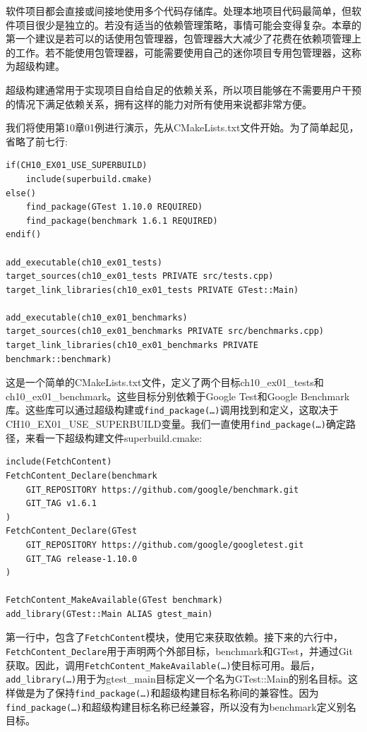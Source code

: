 
软件项目都会直接或间接地使用多个代码存储库。处理本地项目代码最简单，但软件项目很少是独立的。若没有适当的依赖管理策略，事情可能会变得复杂。本章的第一个建议是若可以的话使用包管理器，包管理器大大减少了花费在依赖项管理上的工作。若不能使用包管理器，可能需要使用自己的迷你项目专用包管理器，这称为超级构建。

超级构建通常用于实现项目自给自足的依赖关系，所以项目能够在不需要用户干预的情况下满足依赖关系，拥有这样的能力对所有使用来说都非常方便。


我们将使用第10章01例进行演示，先从CMakeLists.txt文件开始。为了简单起见，省略了前七行:

\begin{lstlisting}[style=styleCMake]
if(CH10_EX01_USE_SUPERBUILD)
	include(superbuild.cmake)
else()
	find_package(GTest 1.10.0 REQUIRED)
	find_package(benchmark 1.6.1 REQUIRED)
endif()

add_executable(ch10_ex01_tests)
target_sources(ch10_ex01_tests PRIVATE src/tests.cpp)
target_link_libraries(ch10_ex01_tests PRIVATE GTest::Main)

add_executable(ch10_ex01_benchmarks)
target_sources(ch10_ex01_benchmarks PRIVATE src/benchmarks.cpp)
target_link_libraries(ch10_ex01_benchmarks PRIVATE benchmark::benchmark)
\end{lstlisting}

这是一个简单的CMakeLists.txt文件，定义了两个目标ch10\_ex01\_tests和ch10\_ex01\_benchmark。这些目标分别依赖于Google Test和Google Benchmark库。这些库可以通过超级构建或\texttt{find\_package(…)}调用找到和定义，这取决于CH10\_EX01\_USE\_SUPERBUILD变量。我们一直使用\texttt{find\_package(…)}确定路径，来看一下超级构建文件superbuild.cmake:

\begin{lstlisting}[style=styleCMake]
include(FetchContent)
FetchContent_Declare(benchmark
	GIT_REPOSITORY https://github.com/google/benchmark.git
	GIT_TAG v1.6.1
)
FetchContent_Declare(GTest
	GIT_REPOSITORY https://github.com/google/googletest.git
	GIT_TAG release-1.10.0
)

FetchContent_MakeAvailable(GTest benchmark)
add_library(GTest::Main ALIAS gtest_main)
\end{lstlisting}

第一行中，包含了\texttt{FetchContent}模块，使用它来获取依赖。接下来的六行中，\texttt{FetchContent\_Declare}用于声明两个外部目标，benchmark和GTest，并通过Git获取。因此，调用\texttt{FetchContent\_MakeAvailable(…)}使目标可用。最后，\texttt{add\_library(…)}用于为gtest\_main目标定义一个名为GTest::Main的别名目标。这样做是为了保持\texttt{find\_package(…)}和超级构建目标名称间的兼容性。因为\texttt{find\_package(…)}和超级构建目标名称已经兼容，所以没有为benchmark定义别名目标。

